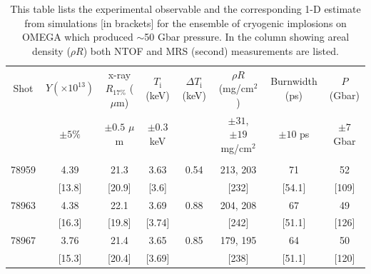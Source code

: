 \documentclass[aip,reprint]{revtex4-1}
\begin{document}
\begin{table}
\caption{\label{tab:Exp_1} This table lists the experimental observable and the corresponding 1-D estimate from simulations [in brackets] for the ensemble of cryogenic implosions on OMEGA which produced $\sim$50 Gbar pressure. In the column showing areal density ($\rho R$) both NTOF and MRS (second) measurements are listed.}
\begin{ruledtabular}
\begin{tabular}{c c c c c c c c}


Shot & $Y (\times 10^{13})$ & x-ray $R_{17\%}$ ($\mu$m) & $T_\text{i}$ (keV) & $\Delta T_\text{i}$ (keV) & $\rho R$ (mg/cm$^2$) & Burnwidth (ps) & $P$ (Gbar) \\


 & $\pm 5 \%$ & $\pm 0.5$ $\mu$m & $\pm 0.3$ keV &  & $\pm 31$, $\pm 19$ mg/cm$^2$ & $\pm 10$ ps & $\pm 7$ Gbar  \\  \hline
\\

78959 &   4.39  & 21.3  & 3.63 & 0.54 & 213, 203 & 71      & 52 \\ 
\vspace{2mm}
         &  [13.8] &[20.9]&  [3.6]&        &  [232]     & [54.1]& [109] \\

78963 & 4.38 & 22.1 & 3.69   &0.88 & 204, 208  & 67     & 49 \\
\vspace{2mm}
         &[16.3]&[19.8]& [3.74]&       &[242]        &[51.1]&[126]  \\  

78967 & 3.76  & 21.4  & 3.65& 0.85  & 179, 195 &	64  & 50 \\
\vspace{2mm}
         & [15.3]&[20.4]&[3.69]&        & [238]     &[51.1]& [120] \\ 


\end{tabular}
\end{ruledtabular}
\end{table}
\end{document}
